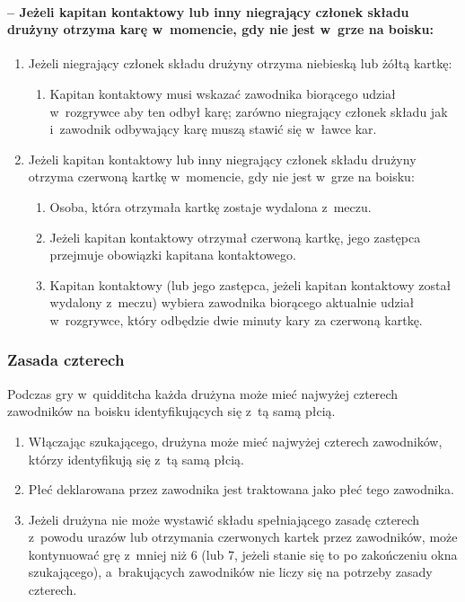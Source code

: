 \documentclass[12pt,a4paper]{article}
\begin{document}
\paragraph{-- Jeżeli kapitan kontaktowy lub inny niegrający członek
	składu drużyny otrzyma karę w~momencie, gdy nie jest w~grze na boisku:}

\begin{enumerate}
	\item
	      Jeżeli niegrający członek składu drużyny otrzyma niebieską lub żółtą
	      kartkę:

	      \begin{enumerate}
		      \item
		            Kapitan kontaktowy musi wskazać zawodnika biorącego udział w~rozgrywce aby ten odbył karę; zarówno niegrający członek składu jak
		            i~zawodnik odbywający karę muszą stawić się w~ławce kar.
	      \end{enumerate}
	\item
	      Jeżeli kapitan kontaktowy lub inny niegrający członek składu drużyny
	      otrzyma czerwoną kartkę w~momencie, gdy nie jest w~grze na boisku:

	      \begin{enumerate}
		      \item
		            Osoba, która otrzymała kartkę zostaje wydalona z~meczu.
		      \item
		            Jeżeli kapitan kontaktowy otrzymał czerwoną kartkę, jego zastępca
		            przejmuje obowiązki kapitana kontaktowego.
		      \item
		            Kapitan kontaktowy (lub jego zastępca, jeżeli kapitan kontaktowy
		            został wydalony z~meczu) wybiera zawodnika biorącego aktualnie
		            udział w~rozgrywce, który odbędzie dwie minuty kary za czerwoną
		            kartkę.
	      \end{enumerate}
\end{enumerate}

\subsubsection{Zasada czterech}

Podczas gry w~quidditcha każda drużyna może mieć najwyżej czterech
zawodników na boisku identyfikujących się z~tą samą płcią.

\begin{enumerate}
	\item
	      Włączając szukającego, drużyna może mieć najwyżej czterech zawodników,
	      którzy identyfikują się z~tą samą płcią.
	\item
	      Płeć deklarowana przez zawodnika jest traktowana jako płeć tego
	      zawodnika.
	\item
	      Jeżeli drużyna nie może wystawić składu spełniającego zasadę czterech
	      z~powodu urazów lub otrzymania czerwonych kartek przez zawodników,
	      może kontynuować grę z~mniej niż 6 (lub 7, jeżeli stanie się to po
	      zakończeniu okna szukającego), a~brakujących zawodników nie liczy się
	      na potrzeby zasady czterech.
\end{enumerate}
\end{document}
